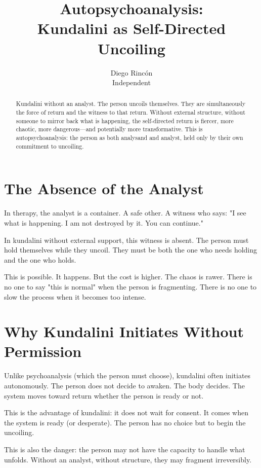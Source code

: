 \documentclass[12pt]{article}
\title{Autopsychoanalysis:\\
Kundalini as Self-Directed Uncoiling}
\author{Diego Rincón\\
\small Independent}
\date{}
\begin{document}
\maketitle

\begin{abstract}
Kundalini without an analyst. The person uncoils themselves. They are simultaneously the force of return and the witness to that return. Without external structure, without someone to mirror back what is happening, the self-directed return is fiercer, more chaotic, more dangerous—and potentially more transformative. This is autopsychoanalysis: the person as both analysand and analyst, held only by their own commitment to uncoiling.
\end{abstract}

\section{The Absence of the Analyst}

In therapy, the analyst is a container. A safe other. A witness who says: "I see what is happening. I am not destroyed by it. You can continue."

In kundalini without external support, this witness is absent. The person must hold themselves while they uncoil. They must be both the one who needs holding and the one who holds.

This is possible. It happens. But the cost is higher. The chaos is rawer. There is no one to say "this is normal" when the person is fragmenting. There is no one to slow the process when it becomes too intense.

\section{Why Kundalini Initiates Without Permission}

Unlike psychoanalysis (which the person must choose), kundalini often initiates autonomously. The person does not decide to awaken. The body decides. The system moves toward return whether the person is ready or not.

This is the advantage of kundalini: it does not wait for consent. It comes when the system is ready (or desperate). The person has no choice but to begin the uncoiling.

This is also the danger: the person may not have the capacity to handle what unfolds. Without an analyst, without structure, they may fragment irreversibly.
\end{document}
